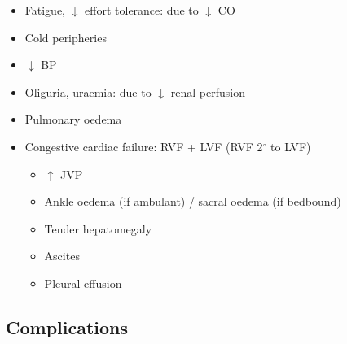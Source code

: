 \documentclass[
  12pt,
]{memoir}
\providecommand{\tightlist}{%
  \setlength{\itemsep}{0pt}\setlength{\parskip}{0pt}}
\begin{document}
\begin{itemize}
\tightlist
\item
  Fatigue, \(\downarrow\) effort tolerance: due to \(\downarrow\) CO
\item
  Cold peripheries
\item
  \(\downarrow\) BP
\item
  Oliguria, uraemia: due to \(\downarrow\) renal perfusion
\item
  Pulmonary oedema
\item
  Congestive cardiac failure: RVF + LVF (RVF 2\(^\circ\) to LVF)

  \begin{itemize}
  \tightlist
  \item
    \(\uparrow\) JVP
  \item
    Ankle oedema (if ambulant) / sacral oedema (if bedbound)
  \item
    Tender hepatomegaly
  \item
    Ascites
  \item
    Pleural effusion
  \end{itemize}
\end{itemize}

\hypertarget{complications}{%
\subsection{Complications}\label{complications}}
\end{document}
